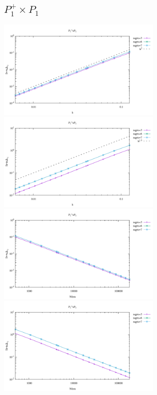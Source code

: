 \newpage
\subsection*{$P_1^+\times P_1$}
\begin{center}
\includegraphics[width=8cm]{python_codes/fieldstone_120/results/P1+P1-velocity-h.pdf}
\includegraphics[width=8cm]{python_codes/fieldstone_120/results/P1+P1-pressure-h.pdf}
\includegraphics[width=8cm]{python_codes/fieldstone_120/results/P1+P1-velocity-Nfem.pdf}
\includegraphics[width=8cm]{python_codes/fieldstone_120/results/P1+P1-pressure-Nfem.pdf}
\end{center}

